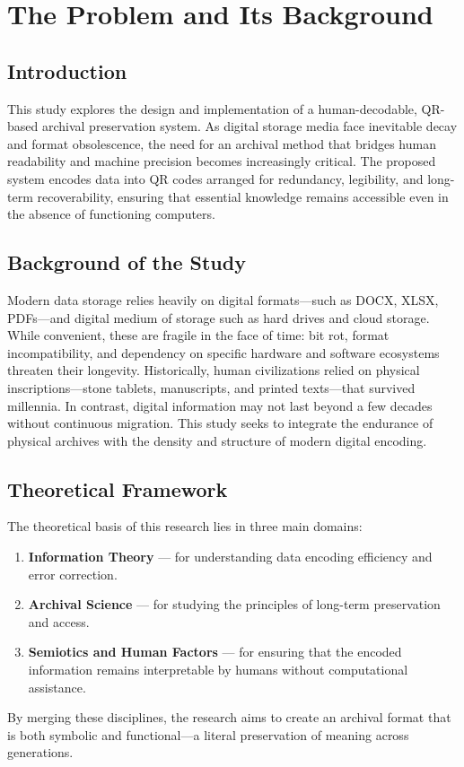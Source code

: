 \documentclass[../../1_thesis]{subfiles}
\begin{document}
\chapter{The Problem and Its Background}

\section{Introduction}

This study explores the design and implementation of a human-decodable, QR-based archival preservation system. As digital storage media face inevitable decay and format obsolescence, the need for an archival method that bridges human readability and machine precision becomes increasingly critical. The proposed system encodes data into QR codes arranged for redundancy, legibility, and long-term recoverability, ensuring that essential knowledge remains accessible even in the absence of functioning computers.

\section{Background of the Study}

Modern data storage relies heavily on digital formats---such as DOCX, XLSX, PDFs---and digital medium of storage such as hard drives and cloud storage. While convenient, these are fragile in the face of time: bit rot, format incompatibility, and dependency on specific hardware and software ecosystems threaten their longevity. Historically, human civilizations relied on physical inscriptions—stone tablets, manuscripts, and printed texts—that survived millennia. In contrast, digital information may not last beyond a few decades without continuous migration. This study seeks to integrate the endurance of physical archives with the density and structure of modern digital encoding.

\section{Theoretical Framework}

The theoretical basis of this research lies in three main domains:
\begin{enumerate}
\item \textbf{Information Theory} — for understanding data encoding efficiency and error correction.
\item \textbf{Archival Science} — for studying the principles of long-term preservation and access.
\item \textbf{Semiotics and Human Factors} — for ensuring that the encoded information remains interpretable by humans without computational assistance.
\end{enumerate}
By merging these disciplines, the research aims to create an archival format that is both symbolic and functional—a literal preservation of meaning across generations.
\end{document}
